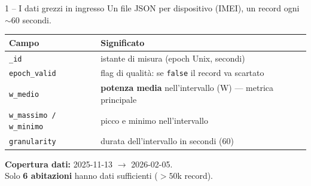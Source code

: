 \documentclass[aspectratio=169]{beamer}
\newcommand{\code}[1]{\texttt{\small #1}}
\begin{document}
\begin{frame}{1 -- I dati grezzi in ingresso}
  Un file JSON per dispositivo (IMEI), un record ogni $\sim$60 secondi.
  \vspace{0.3em}
  \begin{table}\small
    \renewcommand{\arraystretch}{1.15}
    \begin{tabularx}{\textwidth}{l X}
      \toprule
      \textbf{Campo} & \textbf{Significato} \\
      \midrule
      \code{\_id}          & istante di misura (epoch Unix, secondi) \\
      \code{epoch\_valid}  & flag di qualit\`a: se \code{false} il record va scartato \\
      \code{w\_medio}      & \textbf{potenza media} nell'intervallo (W) --- metrica principale \\
      \code{w\_massimo / w\_minimo} & picco e minimo nell'intervallo \\
      \code{granularity}   & durata dell'intervallo in secondi (60) \\
      \bottomrule
    \end{tabularx}
  \end{table}

  \vspace{0.3em}
    \textbf{Copertura dati:} 2025-11-13 $\rightarrow$ 2026-02-05.\\
    Solo \textbf{6 abitazioni} hanno dati sufficienti ($>50$k record).
\end{frame}
\end{document}

